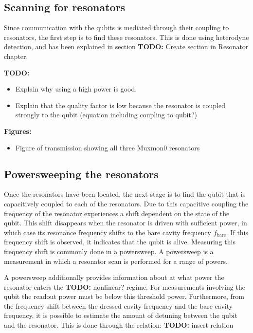 \documentclass[12pt]{report}
\newcommand{\fbare}{$f_\text{bare}$}
\begin{document}
      \subsection{Scanning for resonators}
        Since communication with the qubits is mediated through their coupling to resonators, the first step is to find these resonators. This is done using heterodyne detection, and has been explained in section \textbf{TODO:} Create section in Resonator chapter.

        \textbf{TODO:}
        \begin{itemize}
          \item Explain why using a high power is good.
          \item Explain that the quality factor is low because the resonator is coupled strongly to the qubit (equation including coupling to qubit?)
        \end{itemize}

        \textbf{Figures:}
        \begin{itemize}
          \item Figure of transmission showing all three Muxmon0 resonators
        \end{itemize}

      \subsection{Powersweeping the resonators}
        Once the resonators have been located, the next stage is to find the qubit that is capacitively coupled to each of the resonators. Due to this capacitive coupling the frequency of the resonator experiences a shift dependent on the state of the qubit. This shift disappears when the resonator is driven with sufficient power, in which case its resonance frequency shifts to the bare cavity frequency \fbare. If this frequency shift is observed, it indicates that the qubit is alive. Measuring this frequency shift is commonly done in a powersweep. A powersweep is a measurement in which a resonator scan is performed for a range of powers.


        A powersweep additionally provides information about at what power the resonator enters the \textbf{TODO:} nonlinear? regime. For measurements involving the qubit the readout power must be below this threshold power. Furthermore, from the frequency shift between the dressed cavity frequency and the bare cavity frequency, it is possible to estimate the amount of detuning between the qubit and the resonator. This is done through the relation: \textbf{TODO:} insert relation
\end{document}
